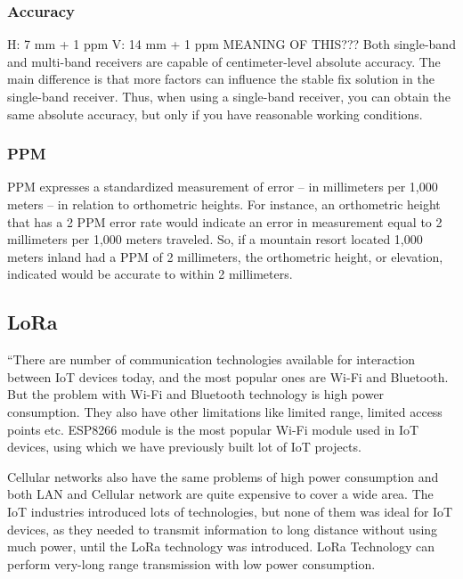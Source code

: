 \subsubsection{Accuracy}\label{sec:II_rtk_parameters_accuracy}

H: 7 mm + 1 ppm
V: 14 mm + 1 ppm	MEANING OF THIS???
Both single-band and multi-band receivers are capable of centimeter-level absolute accuracy. The main difference is that more factors can influence the stable fix solution in the single-band receiver. Thus, when using a single-band receiver, you can obtain the same absolute accuracy, but only if you have reasonable working conditions.

\subsubsection{PPM}\label{sec:II_rtk_parameters_ppm}

PPM expresses a standardized measurement of error -- in millimeters per 1,000 meters -- in relation to orthometric heights. For instance, an orthometric height that has a 2 PPM error rate would indicate an error in measurement equal to 2 millimeters per 1,000 meters traveled. So, if a mountain resort located 1,000 meters inland had a PPM of 2 millimeters, the orthometric height, or elevation, indicated would be accurate to within 2 millimeters.

\subsection{LoRa}\label{sec:II_rtk_LoRa}

``There are number of communication technologies available for interaction between IoT devices today, and the most popular ones are Wi-Fi and Bluetooth. But the problem with Wi-Fi and Bluetooth technology is high power consumption. They also have other limitations like limited range, limited access points etc. ESP8266 module is the most popular Wi-Fi module used in IoT devices, using which we have previously built lot of IoT projects.

Cellular networks also have the same problems of high power consumption and both LAN and Cellular network are quite expensive to cover a wide area. The IoT industries introduced lots of technologies, but none of them was ideal for IoT devices, as they needed to transmit information to long distance without using much power, until the LoRa technology was introduced. LoRa Technology can perform very-long range transmission with low power consumption.

